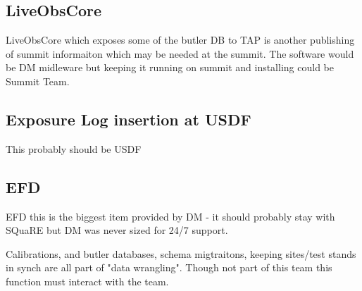 \subsection{ LiveObsCore}
LiveObsCore  which exposes some of the butler DB to TAP is another publishing of summit informaiton which may be needed at the summit.
The software would be DM midleware but keeping it running on summit and installing could be Summit Team.

\subsection{ Exposure Log  insertion at \gls{USDF}}
  This probably  should be \gls{USDF}

\subsection{ \gls{EFD}}
 EFD this is the biggest item provided by \gls{DM} - it should probably stay with SQuaRE but \gls{DM} was never sized for 24/7 support.

Calibrations, and butler databases, schema migtraitons, keeping sites/test stands in synch are all
part of "data wrangling".
Though not part of this team this function must interact with the team.
